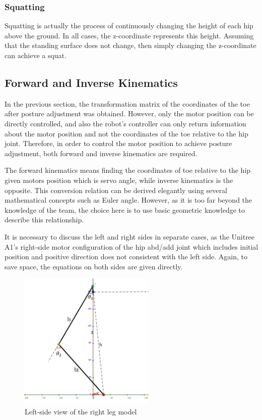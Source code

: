 \subsubsection{Squatting}

Squatting is actually the process of continuously changing the height of each hip above the ground. In all cases, the z-coordinate represents this height. Assuming that the standing surface does not change, then simply changing the z-coordinate can achieve a squat.

\subsection{Forward and Inverse Kinematics}

In the previous section, the transformation matrix of the coordinates of the toe after posture adjustment was obtained. However, only the motor position can be directly controlled, and also the robot's controller can only return information about the motor position and not the coordinates of the toe relative to the hip joint. Therefore, in order to control the motor position to achieve posture adjustment, both forward and inverse kinematics are required.

The forward kinematics means finding the coordinates of toe relative to the hip given motors position which is servo angle, while inverse kinematics is the opposite. This conversion relation can be derived elegantly using several mathematical concepts such as Euler angle. However, as it is too far beyond the knowledge of the team, the choice here is to use basic geometric knowledge to describe this relationship.

It is necessary to discuss the left and right sides in separate cases, as the Unitree A1's right-side motor configuration of the hip abd/add joint which includes initial position and positive direction does not consistent with the left side. Again, to save space, the equations on both sides are given directly.

\begin{figure}[htbp]
   \centering
   \includegraphics[width=0.58\textwidth]{figures/right_leg_model_left-side_view.jpg}
   \caption{Left-side view of the right leg model}
   \label{fig:right_leg_model_left-side_view}
\end{figure}

